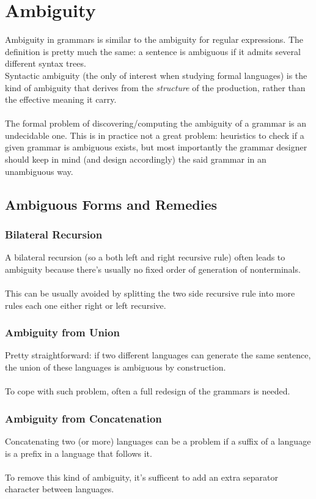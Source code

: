 	\section{Ambiguity}
		Ambiguity in grammars is similar to the ambiguity for regular expressions. The definition is pretty much the same: a sentence is ambiguous if it admits several different syntax trees.\\
		Syntactic ambiguity (the only of interest when studying formal languages) is the kind of ambiguity that derives from the \emph{structure} of the production, rather than the effective meaning it carry.\\\\
		The formal problem of discovering/computing the ambiguity of a grammar is an undecidable one. This is in practice not a great problem: heuristics to check if a given grammar is ambiguous exists, but most importantly the grammar designer should keep in mind (and design accordingly) the said grammar in an unambiguous way.
		
		\subsection{Ambiguous Forms and Remedies}
			\subsubsection{Bilateral Recursion}
				A bilateral recursion (so a both left and right recursive rule) often leads to ambiguity because there's usually no fixed order of generation of nonterminals.\\\\
				This can be usually avoided by splitting the two side recursive rule into more rules each one either right or left recursive.\\
			\subsubsection{Ambiguity from Union}
				Pretty straightforward: if two different languages can generate the same sentence, the union of these languages is ambiguous by construction.\\\\
				To cope with such problem, often a full redesign of the grammars is needed.\\
			\subsubsection{Ambiguity from Concatenation}
				Concatenating two (or more) languages can be a problem if a suffix of a language is a prefix in a language that follows it.\\\\
				To remove this kind of ambiguity, it's sufficent to add an extra separator character between languages.\\
